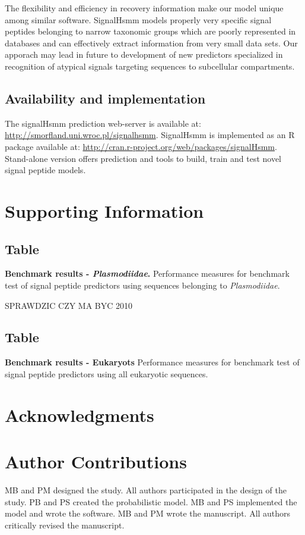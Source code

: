 \documentclass[10pt,letterpaper]{article}
\newcommand{\beginsupplement}{%
        \setcounter{subsection}{0}
        \renewcommand{\thesubsection}{S\arabic{subsection}}
     }
\begin{document}
The flexibility and efficiency in recovery information make our model unique among similar software. SignalHsmm models properly very specific signal peptides belonging to narrow taxonomic groups which are poorly represented in databases and can effectively extract information from very small data sets. Our apporach may lead in future to development of new predictors specialized in recognition of atypical signals targeting sequences to subcellular compartments.


\subsection*{Availability and implementation}
The signalHsmm prediction web-server is available at: \url{http://smorfland.uni.wroc.pl/signalhsmm}. SignalHsmm is implemented as an R package available at: \url{http://cran.r-project.org/web/packages/signalHsmm}. Stand-alone version offers prediction and tools to build, train and test novel signal peptide models.

\section*{Supporting Information}

\beginsupplement
\subsection{Table}
\label{tab:bench2010plas_full}
{\bf Benchmark results - \textit{Plasmodiidae}.} Performance measures for benchmark test of signal peptide predictors using sequences belonging to \textit{Plasmodiidae}.

SPRAWDZIC CZY MA BYC 2010

\subsection{Table}
\label{tab:bench2010_full}
{\bf Benchmark results - Eukaryots} Performance measures for benchmark test of signal peptide predictors using all eukaryotic sequences.


\section*{Acknowledgments}

\section*{Author Contributions}
MB and PM designed the study. All authors participated in the design of the study. PB and PS created the probabilistic model. MB and PS implemented the model and wrote the software. MB and PM wrote the manuscript. All authors critically revised the manuscript.
\end{document}
